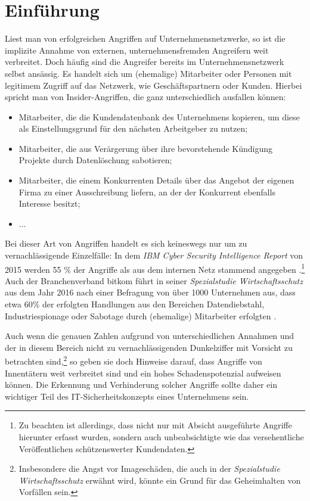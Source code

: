 \chapter{Einführung}

\label{cha_introduction}


Liest man von erfolgreichen Angriffen auf Unternehmensnetzwerke, so ist die implizite Annahme von externen, unternehmensfremden Angreifern weit verbreitet. Doch häufig sind die Angreifer bereits im Unternehmensnetzwerk selbst ansässig. Es handelt sich um (ehemalige) Mitarbeiter oder Personen mit legitimem Zugriff auf das Netzwerk, wie Geschäftspartnern oder Kunden. Hierbei spricht man von Insider-Angriffen, die ganz unterschiedlich ausfallen können:
\begin{itemize}
  \item Mitarbeiter, die die Kundendatenbank des Unternehmens kopieren, um diese als Einstellungsgrund für den nächsten Arbeitgeber zu nutzen;
  \item Mitarbeiter, die aus Verärgerung über ihre bevorstehende Kündigung Projekte durch Datenlöschung sabotieren;
  \item Mitarbeiter, die einem Konkurrenten Details über das Angebot der eigenen Firma zu einer Ausschreibung liefern, an der der Konkurrent ebenfalls Interesse besitzt;
  \item ...
\end{itemize}
Bei dieser Art von Angriffen handelt es sich keineswegs nur um zu vernachlässigende Einzelfälle:
In dem \textit{IBM Cyber Security Intelligence Report} von 2015 werden 55 \% der Angriffe als aus dem internen Netz stammend angegeben \cite{ibm2015}.\footnote{
  Zu beachten ist allerdings, dass nicht nur mit Absicht ausgeführte Angriffe hierunter erfasst wurden, sondern auch unbeabsichtigte wie das versehentliche Veröffentlichen schützenswerter Kundendaten.
}
Auch der Branchenverband bitkom führt in seiner \textit{Spezialstudie Wirtschaftsschutz} aus dem Jahr 2016 nach einer Befragung von über 1000 Unternehmen aus, dass etwa 60\% der erfolgten Handlungen aus den Bereichen Datendiebstahl, Industriespionage oder Sabotage durch (ehemalige) Mitarbeiter erfolgten \cite{bitkom2016}.

Auch wenn die genauen Zahlen aufgrund von unterschiedlichen Annahmen und der in diesem Bereich nicht zu vernachlässigenden Dunkelziffer mit Vorsicht zu betrachten sind,\footnote{
	Insbesondere die Angst vor Imageschäden, die auch in der \textit{Spezialstudie Wirtschaftsschutz} erwähnt wird, könnte ein Grund für das Geheimhalten von Vorfällen sein.
} so geben sie doch Hinweise darauf, dass Angriffe von Innentätern weit verbreitet sind und ein hohes Schadenspotenzial aufweisen können. Die Erkennung und Verhinderung solcher Angriffe sollte daher ein wichtiger Teil des IT-Sicherheitskonzepts eines Unternehmens sein.


